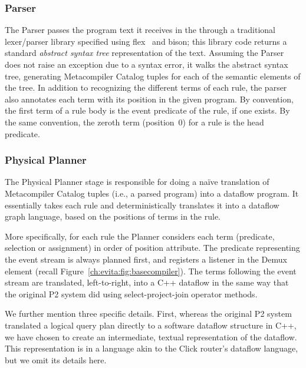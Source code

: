 \subsubsection{Parser}
\label{ch:evita:sec:parser}

The Parser passes the program text it receives in the 
through a traditional lexer/parser library specified using
flex~\cite{flexUrl} and bison\cite{bisonUrl}; this library code returns
a standard {\em abstract syntax tree} representation of the text.
Assuming the Parser does not raise an exception due to a syntax error,
it walks the abstract syntax tree, generating Metacompiler Catalog
tuples for each of the semantic elements of the tree. In addition to
recognizing the different terms of each rule, the parser also annotates
each term with its position in the given program.  By convention, the
first term of a rule body is the event predicate of the rule, if one
exists.  By the same convention, the zeroth term (position~$0$) for a
rule is the head predicate.



\subsubsection{Physical Planner}
\label{ch:evita:sec:planner}

The Physical Planner stage is responsible for doing a na\"{i}ve translation of
Metacompiler Catalog tuples (i.e., a parsed \OVERLOG program) into a dataflow
program.  It essentially takes each rule and deterministically translates it
into a dataflow graph language, based on the positions of terms in the rule.

More specifically, for each rule the Planner considers each term (predicate,
selection or assignment) in order of position attribute.  The predicate
representing the event stream is always planned first, and registers a listener
in the Demux element (recall Figure~\ref{ch:evita:fig:basecompiler}).  The
terms following the event stream are translated, left-to-right, into a C++
dataflow in the same way that the original P2 system did using
select-project-join operator methods.

We further mention three specific details.  First, whereas the original P2
system translated a logical query plan directly to a software dataflow
structure in C++, we have chosen to create an intermediate, textual
representation of the dataflow.  This representation is in a language akin to
the Click router's dataflow language, but we omit its details here.

